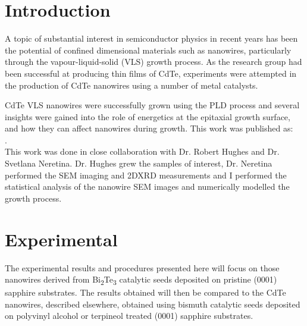\section{Introduction} \label{sec:cdtenanowires}
A topic of substantial interest in semiconductor physics in recent years has been the potential of confined dimensional materials such as nanowires, particularly through the vapour-liquid-solid (VLS) growth process.
As the research group had been successful at producing thin films of CdTe, experiments were attempted in the production of CdTe nanowires using a number of metal catalysts.

CdTe VLS nanowires were successfully grown using the PLD process and several insights were gained into the role of energetics at the epitaxial growth surface, and how they can affect nanowires during growth.
This work was published as:\\
 \cite{Neretina2008b}.\\
This work was done in close collaboration with Dr. Robert Hughes and Dr. Svetlana Neretina. Dr. Hughes grew the samples of interest, Dr. Neretina performed the SEM imaging and 2DXRD measurements and I performed the statistical analysis of the nanowire SEM images and numerically modelled the growth process.
\section{Experimental}
The experimental results and procedures presented here will focus on those nanowires derived from Bi\textsubscript{2}Te\textsubscript{3} catalytic seeds deposited on pristine (0001) sapphire substrates.
The results obtained will then be compared to the CdTe nanowires, described elsewhere\cite{Neretina2007b}, obtained using bismuth catalytic seeds deposited on polyvinyl alcohol or terpineol treated (0001) sapphire substrates.


